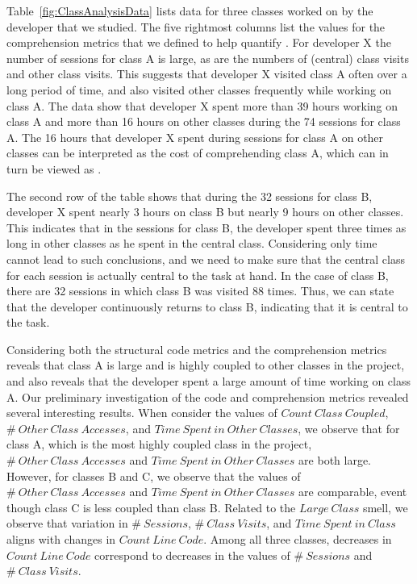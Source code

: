 Table~\ref{fig:ClassAnalysisData} lists data for three classes worked on by the developer that we studied. The five rightmost columns list the values for the comprehension metrics that we defined to help quantify \TD. For developer X the number of sessions for class A is large, as are the numbers of (central) class visits and other class visits. This suggests that developer X visited class A often over a long period of time, and also visited other classes frequently while working on class A. The data show that developer X spent more than 39 hours working on class A and more than 16 hours on other classes during the 74 sessions for class A. The 16 hours that developer X spent during sessions for class A on other classes can be interpreted as the cost of comprehending class A, which can in turn be viewed as \TD.

The second row of the table shows that during the 32 sessions for class B, developer X spent nearly 3 hours on class B but nearly 9 hours on other classes. This indicates that in the sessions for class B, the developer spent three times as long in other classes as he spent in the central class. Considering only time cannot lead to such conclusions, and we need to make sure that the central class for each session is actually central to the task at hand. In the case of class B, there are 32 sessions in which class B was visited 88 times. Thus, we can state that the developer continuously returns to class B, indicating that it is central to the task. 


Considering both the structural code metrics and the comprehension metrics reveals that class A is large and is highly coupled to other classes in the project, and also reveals that the developer spent a large amount of time working on class A. Our preliminary investigation of the code and comprehension metrics revealed several interesting results. When consider the values of $Count~Class~Coupled$, $\#~Other~Class~Accesses$, and $Time~Spent~in~Other~Classes$, we observe that for class A, which is the most highly coupled class in the project, $\#~Other~Class~Accesses$ and $Time~Spent~in~Other~Classes$ are both large. However, for classes B and C, we observe that the values of $\#~Other~Class~Accesses$ and $Time~Spent~in~Other~Classes$ are comparable, event though class C is less coupled than class B. Related to the $Large~Class$ smell, we observe that variation in $\#~Sessions$, $\#~Class~Visits$, and $Time~Spent~in~Class$ aligns with changes in $Count~Line~Code$. Among all three classes, decreases in $Count~Line~Code$ correspond to decreases in the values of $\#~Sessions$ and $\#~Class~Visits$. 

